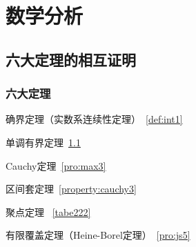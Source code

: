 \documentclass[12pt, a4paper, oneside, UTF8]{ctexbook}
\begin{document}
	\else
	\fi
	\part{数学分析}
	\chapter{六大定理的相互证明}
	\section{六大定理}
	
	\label{thm:fubi2}
	\label{pro:max3}
	\label{property:cauchy3}
	\label{tabe222}
	\label{pro:js5}
	
	\begin{introduction}
		\item 确界定理（实数系连续性定理）~\ref{def:int1}
		\item 单调有界定理~\ref{thm:fubi2}
		\item Cauchy定理~\ref{pro:max3}
		\item 区间套定理~\ref{property:cauchy3}
		\item 聚点定理 ~\ref{tabe222}
		\item 有限覆盖定理（Heine-Borel定理）~\ref{pro:js5}
	\end{introduction}
		
\end{document}
